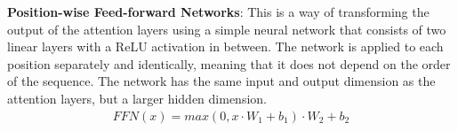 \textbf{Position-wise Feed-forward Networks}: This is a way of transforming the output of the attention layers using a simple neural network that consists of two linear layers with a ReLU activation in between. The network is applied to each position separately and identically, meaning that it does not depend on the order of the sequence. The network has the same input and output dimension as the attention layers, but a larger hidden dimension.
\begin{align}
    FFN(x)=max(0,x\cdot W_1+b_1)\cdot W_2+b_2
\end{align}
